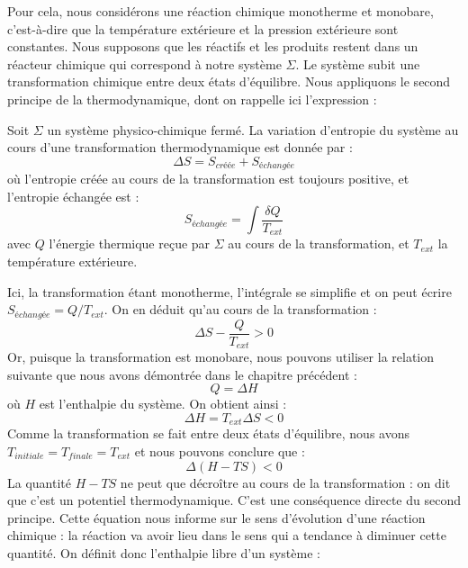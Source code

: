 \documentclass[11pt,fleqn]{book} %
\begin{document}
Pour cela, nous considérons une réaction chimique monotherme et monobare, c'est-à-dire que la température extérieure et la pression extérieure sont constantes. Nous supposons que les réactifs et les produits restent dans un réacteur chimique qui correspond à notre système $\Sigma$. Le système subit une transformation chimique entre deux états d'équilibre. Nous appliquons le second principe de la thermodynamique, dont on rappelle ici l'expression :
\begin{theorem}
    Soit $\Sigma$ un système physico-chimique fermé. La variation d'entropie du système au cours d'une transformation thermodynamique est donnée par :
    \begin{equation}
        \Delta S = S_{créée} + S_{échangée}
    \end{equation}
    où l'entropie créée au cours de la transformation est toujours positive, et l'entropie échangée est :
    \begin{equation}
        S_{échangée} = \int \frac{\delta Q}{T_{ext}}
    \end{equation}
    avec $Q$ l'énergie thermique reçue par $\Sigma$ au cours de la transformation, et $T_{ext}$ la température extérieure.
\end{theorem}
Ici, la transformation étant monotherme, l'intégrale se simplifie et on peut écrire $S_{échangée} = Q/T_{ext}$. On en déduit qu'au cours de la transformation :
\begin{equation}
    \Delta S - \frac{Q}{T_{ext}} > 0
\end{equation}
Or, puisque la transformation est monobare, nous pouvons utiliser la relation suivante que nous avons démontrée dans le chapitre précédent :
\begin{equation}
    Q = \Delta H
\end{equation}
où $H$ est l'enthalpie du système. On obtient ainsi :
\begin{equation}
    \Delta H = T_{ext} \Delta S < 0
\end{equation}
Comme la transformation se fait entre deux états d'équilibre, nous avons $T_{initiale} = T_{finale} = T_{ext}$ et nous pouvons conclure que :
\begin{equation}
    \Delta(H - TS) < 0
\end{equation}
La quantité $H - TS$ ne peut que décroître au cours de la transformation : on dit que c'est un potentiel thermodynamique. C'est une conséquence directe du second principe. Cette équation nous informe sur le sens d'évolution d'une réaction chimique : la réaction va avoir lieu dans le sens qui a tendance à diminuer cette quantité. On définit donc l'enthalpie libre d'un système :
\end{document}
